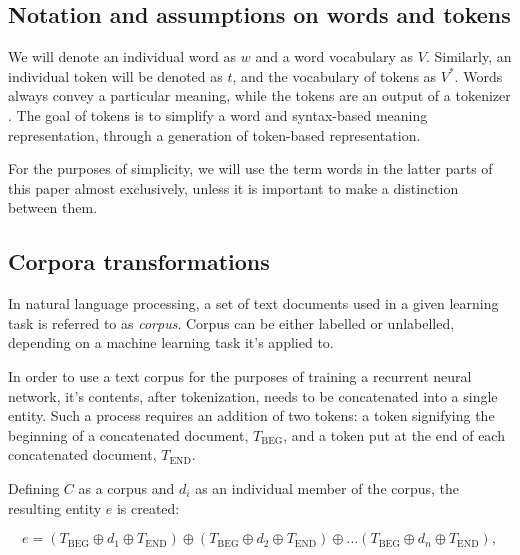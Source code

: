 
\subsection{Notation and assumptions on words and tokens}

We will denote an individual word as $w$ and a word vocabulary as $V$. Similarly, an individual token will be denoted as $t$, and the vocabulary of tokens as $V^*$. Words always convey a particular meaning, while the tokens are an output of a tokenizer \cite{hirst:neuralnetworkmethodsinnlp}. The goal of tokens is to simplify a word and syntax-based meaning representation, through a generation of token-based representation.

For the purposes of simplicity, we will use the term words in the latter parts of this paper almost exclusively, unless it is important to make a distinction between them.

\subsection{Corpora transformations}

In natural language processing, a set of text documents used in a given learning task is referred to as \emph{corpus}. Corpus can be either labelled or unlabelled, depending on a machine learning task it's applied to.

In order to use a text corpus for the purposes of training a recurrent neural network, it's contents, after tokenization, needs to be concatenated into a single entity. Such a process requires an addition of two tokens: a token signifying the beginning of a concatenated document, $T_{\mathrm{BEG}}$, and a token put at the end of each concatenated document, $T_{\mathrm{END}}$. 

Defining $C$ as a corpus and $d_i$ as an individual member of the corpus, the resulting entity $e$ is created:

\begin{equation}
e =(T_{\mathrm{BEG}}\oplus d_1 \oplus T_{\mathrm{END}}) \oplus (T_{\mathrm{BEG}}\oplus d_2 \oplus T_{\mathrm{END}}) \oplus \dots (T_{\mathrm{BEG}} \oplus d_n \oplus T_{\mathrm{END}}),
\end{equation}

